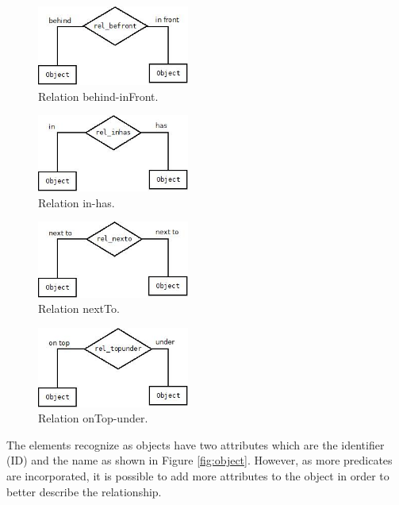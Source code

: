 \begin{figure}[H]
    \centering
    \includegraphics[width=5cm]{figures/befront.jpg}
    \caption{Relation behind-inFront.}
    \label{fig:befront}
\end{figure}

\begin{figure}[H]
    \centering
    \includegraphics[width=5cm]{figures/inhas.jpg}
    \caption{Relation in-has.}
    \label{fig:inhas}
\end{figure}

\begin{figure}[H]
    \centering
    \includegraphics[width=5cm]{figures/nextto.jpg}
    \caption{Relation nextTo.}
    \label{fig:nexto}
\end{figure}

\begin{figure}[H]
    \centering
    \includegraphics[width=5cm]{figures/topunder.jpg}
    \caption{Relation onTop-under.}
    \label{fig:topUnder}
\end{figure}

The elements recognize as objects have two attributes which are the identifier 
(ID) and the name as shown in Figure \ref{fig:object}. However, as more 
predicates are incorporated, it is possible to add more attributes to the 
object in order to better describe the relationship.


